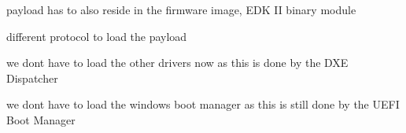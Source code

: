 payload has to also reside in the firmware image, EDK II binary module

different protocol to load the payload

we dont have to load the other drivers now as this is done by the DXE Dispatcher

we dont have to load the windows boot manager as this is still done by the UEFI Boot Manager